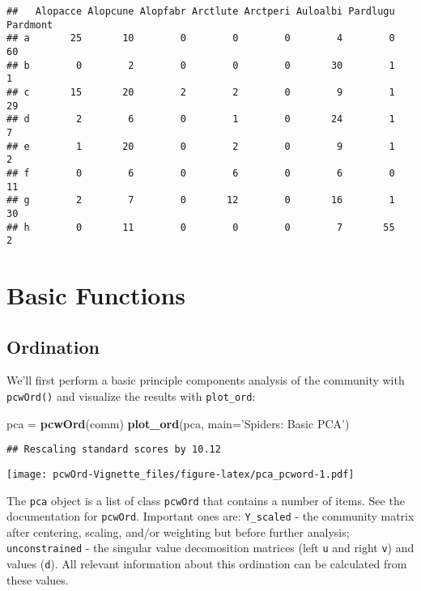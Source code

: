 \documentclass[
]{article}
\newenvironment{Shaded}{\begin{snugshade}}{\end{snugshade}}
\newcommand{\DataTypeTok}[1]{\textcolor[rgb]{0.13,0.29,0.53}{#1}}
\newcommand{\KeywordTok}[1]{\textcolor[rgb]{0.13,0.29,0.53}{\textbf{#1}}}
\newcommand{\NormalTok}[1]{#1}
\newcommand{\StringTok}[1]{\textcolor[rgb]{0.31,0.60,0.02}{#1}}
\begin{document}
\begin{verbatim}
##   Alopacce Alopcune Alopfabr Arctlute Arctperi Auloalbi Pardlugu Pardmont
## a       25       10        0        0        0        4        0       60
## b        0        2        0        0        0       30        1        1
## c       15       20        2        2        0        9        1       29
## d        2        6        0        1        0       24        1        7
## e        1       20        0        2        0        9        1        2
## f        0        6        0        6        0        6        0       11
## g        2        7        0       12        0       16        1       30
## h        0       11        0        0        0        7       55        2
\end{verbatim}

\hypertarget{basic-functions}{%
\section{Basic Functions}\label{basic-functions}}

\hypertarget{ordination}{%
\subsection{Ordination}\label{ordination}}

We'll first perform a basic principle components analysis of the
community with \texttt{pcwOrd()} and visualize the results with
\texttt{plot\_ord}:

\begin{Shaded}
\begin{Highlighting}[]
\NormalTok{pca =}\StringTok{ }\KeywordTok{pcwOrd}\NormalTok{(comm)}
\KeywordTok{plot_ord}\NormalTok{(pca, }
         \DataTypeTok{main=}\StringTok{'Spiders: Basic PCA'}\NormalTok{)}
\end{Highlighting}
\end{Shaded}

\begin{verbatim}
## Rescaling standard scores by 10.12
\end{verbatim}

\texttt{[image: pcwOrd-Vignette\_files/figure-latex/pca\_pcword-1.pdf]}

The \texttt{pca} object is a list of class \texttt{pcwOrd} that contains
a number of items. See the documentation for \texttt{pcwOrd}. Important
ones are: \texttt{\textquotesingle{}Y\_scaled\textquotesingle{}} - the
community matrix after centering, scaling, and/or weighting but before
further analysis;
\texttt{\textquotesingle{}unconstrained\textquotesingle{}} - the
singular value decomosition matrices (left
\texttt{\textquotesingle{}u\textquotesingle{}} and right
\texttt{\textquotesingle{}v\textquotesingle{}}) and values
(\texttt{\textquotesingle{}d\textquotesingle{}}). All relevant
information about this ordination can be calculated from these values.
\end{document}
